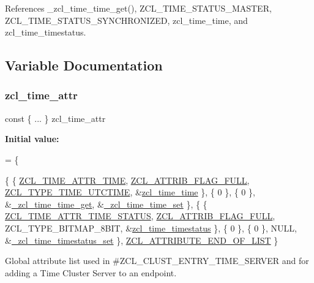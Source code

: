 References \+\_\+zcl\+\_\+time\+\_\+time\+\_\+get(), Z\+C\+L\+\_\+\+T\+I\+M\+E\+\_\+\+S\+T\+A\+T\+U\+S\+\_\+\+M\+A\+S\+T\+ER, Z\+C\+L\+\_\+\+T\+I\+M\+E\+\_\+\+S\+T\+A\+T\+U\+S\+\_\+\+S\+Y\+N\+C\+H\+R\+O\+N\+I\+Z\+ED, zcl\+\_\+time\+\_\+time, and zcl\+\_\+time\+\_\+timestatus.



\subsection{Variable Documentation}
\mbox{\label{group__zcl__time_gad6a3c9d4f109933785ddc31101dabdc1}} 
\subsubsection{\texorpdfstring{zcl\+\_\+time\+\_\+attr}{zcl\_time\_attr}}
{\footnotesize\ttfamily const \{ ... \}   zcl\+\_\+time\+\_\+attr}

{\bfseries Initial value\+:}
\begin{DoxyCode}
=
\{

   \{ \{ \hyperlink{group__zcl__time_ga6abf0e2cc70ac533ebe153a40185be63}{ZCL\_TIME\_ATTR\_TIME},
      \hyperlink{group__zcl_ga40104652d30fa17b7ea5dde9e8b788b8}{ZCL\_ATTRIB\_FLAG\_FULL},
      \hyperlink{group__zcl__types_ga8f678e97557cb052c0df4be97e9f1e82}{ZCL\_TYPE\_TIME\_UTCTIME},
      &\hyperlink{group__zcl__time_ga4e1da84a7e72ee1626d6328252fd621a}{zcl\_time\_time} \},
      \{ 0 \}, \{ 0 \},
      &\hyperlink{group__zcl__time_ga9c0749b71318a4f7fd28d9112ffd5462}{\_zcl\_time\_time\_get}, &\hyperlink{group__zcl__time_ga052b988d6d2448af6640028b45ee1f68}{\_zcl\_time\_time\_set} \},
   \{ \{ \hyperlink{group__zcl__time_ga5931aa648c777cb21c8337249b6e1699}{ZCL\_TIME\_ATTR\_TIME\_STATUS},
      \hyperlink{group__zcl_ga40104652d30fa17b7ea5dde9e8b788b8}{ZCL\_ATTRIB\_FLAG\_FULL},
      ZCL\_TYPE\_BITMAP\_8BIT,
      &\hyperlink{group__zcl__time_ga76f465fead960f138224d8e2a9a59469}{zcl\_time\_timestatus} \},
      \{ 0 \}, \{ 0 \},
      NULL, &\hyperlink{group__zcl__time_ga1b55e2dc0a4e0752c92dda9b65d349d2}{\_zcl\_time\_timestatus\_set} \},
   \hyperlink{group__zcl_gab05da20cf1dfaef97e20dfca2fd26d14}{ZCL\_ATTRIBUTE\_END\_OF\_LIST}
\}
\end{DoxyCode}


Global attribute list used in \#\+Z\+C\+L\+\_\+\+C\+L\+U\+S\+T\+\_\+\+E\+N\+T\+R\+Y\+\_\+\+T\+I\+M\+E\+\_\+\+S\+E\+R\+V\+ER and for adding a Time Cluster Server to an endpoint. 

